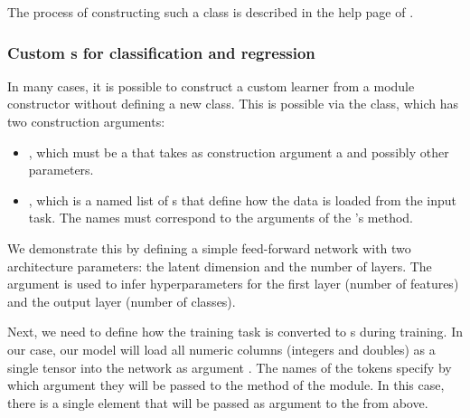 \documentclass[article]{jss}
\theoremstyle{definition}
\begin{document}
The process of constructing such a class is described in the help page of .

\subsubsection[Custom Learners for classification and regression]{Custom s for classification and regression}\label{sec:extending-learner}

In many cases, it is possible to construct a custom learner from a module constructor without defining a new class.
This is possible via the  class, which has two construction arguments:
\begin{itemize}
    \item {}, which must be a  that takes as construction argument a  and possibly other parameters.
    \item {}, which is a named list of s that define how the data is loaded from the input task. The names must correspond to the arguments of the 's  method.
\end{itemize}

We demonstrate this by defining a simple feed-forward network with two architecture parameters: the latent dimension and the number of layers.
The  argument is used to infer hyperparameters for the first layer (number of features) and the output layer (number of classes).


Next, we need to define how the training task is converted to s during training.
In our case, our model will load all numeric columns (integers and doubles) as a single tensor into the network as argument .
The names of the tokens specify by which argument they will be passed to the  method of the module.
In this case, there is a single element that will be passed as argument  to the  from above.
\end{document}
